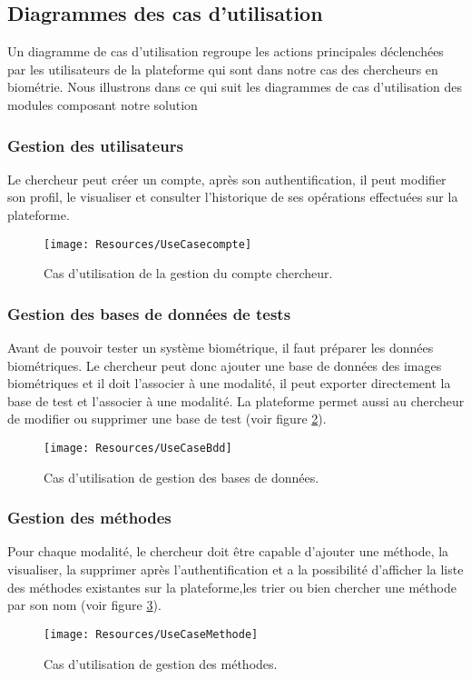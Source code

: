 \subsection{Diagrammes des cas d'utilisation } 

Un diagramme de cas d’utilisation regroupe les actions principales déclenchées par les utilisateurs
de la plateforme qui sont dans notre cas des chercheurs en biométrie. Nous illustrons dans ce qui suit les diagrammes de cas d'utilisation des modules composant notre solution
\clearpage
\subsubsection{Gestion des utilisateurs }
Le chercheur peut créer un compte, après son authentification, il peut modifier son profil, le visualiser et consulter l’historique de ses opérations effectuées sur la plateforme.
\begin{figure}[H]
	\centering
	\texttt{[image: Resources/UseCasecompte]}
	
	\caption{Cas d'utilisation de la gestion du compte chercheur.}
	\label{usecasecompte}
\end{figure}
\clearpage
\subsubsection{Gestion des bases de données de tests}
Avant de pouvoir tester un système biométrique, il faut préparer les données biométriques.
Le chercheur peut donc ajouter une base de données des images biométriques et il doit l’associer à une modalité, il peut exporter directement la base de test et l’associer à une modalité. La plateforme permet aussi au chercheur de modifier ou supprimer une base de test (voir figure \ref{usecasebdd}).

\begin{figure}[H]
	\centering
	\texttt{[image: Resources/UseCaseBdd]}
	
	\caption{Cas d'utilisation de gestion des bases de données.}
	\label{usecasebdd}
\end{figure}
\clearpage
\subsubsection{Gestion des méthodes}
Pour chaque modalité, le chercheur doit être capable d’ajouter une méthode, la visualiser, la supprimer après l’authentification et a la possibilité d’afficher la liste des méthodes existantes sur la plateforme,les trier ou bien chercher une méthode par son nom (voir figure \ref{usecasemethod}).
\begin{figure}[H]
	\centering
	\texttt{[image: Resources/UseCaseMethode]}
	
	\caption{Cas d'utilisation de gestion des méthodes.}
	\label{usecasemethod}
\end{figure}
\clearpage

